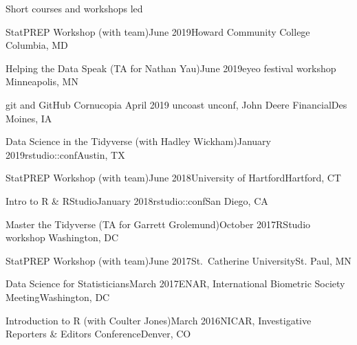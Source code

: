 \documentclass{resume} %
\begin{document}
\clearpage


\begin{rSection}{Short courses and workshops led}

\begin{sSubsection}{StatPREP Workshop}{ (with team)}{June 2019}{Howard Community College }{Columbia, MD}
\end{sSubsection}

\begin{sSubsection}{Helping the Data Speak}{ (TA for Nathan Yau)}{June 2019}{eyeo festival workshop }{Minneapolis, MN}
\end{sSubsection}

\begin{sSubsection}{git and GitHub Cornucopia}{ }{April 2019}{ uncoast unconf, John Deere Financial}{Des Moines, IA}
\end{sSubsection}

\begin{sSubsection}{Data Science in the Tidyverse}{ (with Hadley Wickham)}{January 2019}{rstudio::conf}{Austin, TX}
\end{sSubsection}

\begin{sSubsection}{StatPREP Workshop}{ (with team)}{June 2018}{University of Hartford}{Hartford, CT}
\end{sSubsection}

\begin{sSubsection}{Intro to R \& RStudio}{}{January 2018}{rstudio::conf}{San Diego, CA}
\end{sSubsection}

\begin{sSubsection}{Master the Tidyverse}{ (TA for Garrett Grolemund)}{October 2017}{RStudio workshop }{Washington, DC}
\end{sSubsection}

\begin{sSubsection}{StatPREP Workshop}{ (with team)}{June 2017}{St.~Catherine University}{St. Paul, MN}
\end{sSubsection}

\begin{sSubsection}{Data Science for Statisticians}{}{March 2017}{ENAR, International Biometric Society Meeting}{Washington, DC}
\end{sSubsection}

\begin{sSubsection}{Introduction to R }{(with Coulter Jones)}{March 2016}{NICAR, Investigative Reporters \& Editors Conference}{Denver, CO}
\end{sSubsection}



\end{rSection}
\end{document}
